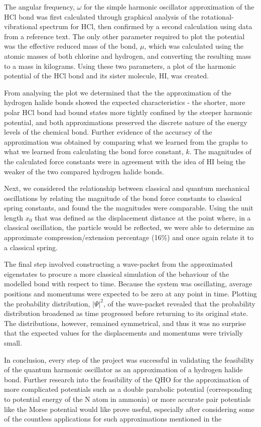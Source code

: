 \documentclass[11pt]{article}
\begin{document}
The angular frequency, $\omega$ for the simple harmonic oscillator approximation of the HCl bond was first calculated through graphical analysis of  the rotational-vibrational spectrum for HCl, then confirmed by a second calculation using data from a reference text. The only other parameter required to plot the potential was the effective reduced mass of the bond, $\mu$, which was calculated using the atomic masses of both chlorine and hydrogen, and converting the resulting mass to a mass in kilograms. Using these two parameters, a plot of the harmonic potential of the HCl bond and its sister molecule, HI, was created.

From analysing the plot we determined that the the approximation of the hydrogen halide bonds showed the expected characteristics - the shorter, more polar HCl bond had bound states more tightly confined by the steeper harmonic potential, and both approximations preserved the discrete nature of the energy levels of the chemical bond. Further evidence of the accuracy of the approximation was obtained by comparing what we learned from the graphs to what we learned from calculating the bond force constant, $k$. The magnitudes of the calculated force constants were in agreement with the idea of HI being the weaker of the two compared hydrogen halide bonds.

Next, we considered the relationship between classical and quantum mechanical oscillations by relating the magnitude of the bond force constants to classical spring constants, and found the the magnitudes were comparable. Using the unit length $x_0$ that was defined as the displacement distance at the point where, in a classical oscillation, the particle would be reflected, we were able to determine an approximate compression/extension percentage (16\%) and once again relate it to a classical spring.

The final step involved constructing a wave-packet from the approximated eigenstates to procure a more classical simulation of the behaviour of the modelled bond with respect to time. Because the system was oscillating, average positions and momentums were expected to be zero at any point in time. Plotting the probability distribution, $|\Psi|^2$, of the wave-packet revealed that the probability distribution broadened as time progressed before returning to its original state. The distributions, however, remained symmetrical, and thus it was no surprise that the expected values for the displacements and momentums were trivially small.

In conclusion, every step of the project was successful in validating the feasibility of the quantum harmonic oscillator as an approximation of a hydrogen halide bond. Further research into the feasibility of the QHO for the approximation of more complicated potentials such as a double parabolic potential\cite{RefWorks:4} (corresponding to potential energy of the N atom in ammonia) or more accurate pair potentials like the Morse potential would like prove useful, especially after considering some of the countless applications for such approximations mentioned in the 
\newpage


\end{document}
